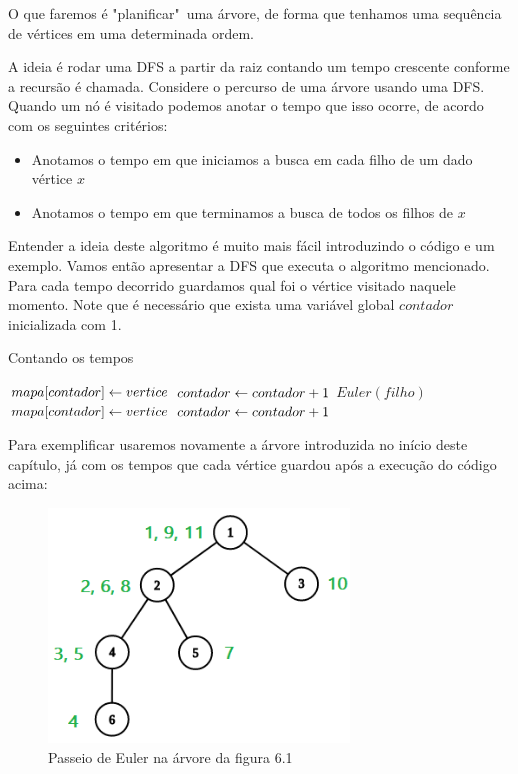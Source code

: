 O que faremos é "planificar"\ uma árvore, de forma que tenhamos uma sequência de vértices em uma determinada ordem.

A ideia é rodar uma DFS a partir da raiz contando um tempo crescente conforme a recursão é chamada. Considere o percurso de uma árvore usando uma DFS. Quando um nó é visitado podemos anotar o tempo que isso ocorre, de acordo com os seguintes critérios:

\begin{itemize}
    \item Anotamos o tempo em que iniciamos a busca em cada filho de um dado vértice $x$
    \item Anotamos o tempo em que terminamos a busca de todos os filhos de $x$
\end{itemize}

Entender a ideia deste algoritmo é muito mais fácil introduzindo o código e um exemplo. Vamos então apresentar a DFS que executa o algoritmo mencionado. Para cada tempo decorrido guardamos qual foi o vértice visitado naquele momento. Note que é necessário que exista uma variável global $contador$ inicializada com 1.

\vspace{10cm}

\begin{algorithm}[H]
\caption{Contando os tempos}
\begin{algorithmic}[1]
        \State $mapa[contador] \leftarrow vertice$
        \State $contador \leftarrow contador + 1$
        \State $Euler(filho)$
    \EndFor
    \State $mapa[contador] \leftarrow vertice$
    \State $contador \leftarrow contador + 1$
\EndFunction
\end{algorithmic}
\end{algorithm}


Para exemplificar usaremos novamente a árvore introduzida no início deste capítulo, já com os tempos que cada vértice guardou após a execução do código acima:

\vspace{0.5cm}

\begin{figure}[htb]
\begin{center}
\includegraphics[width=8cm]{images/graph_euler_numbered.png}
\end{center}
\caption{\label{fig:arvore-euler2}Passeio de Euler na árvore da figura 6.1}
\end{figure}

